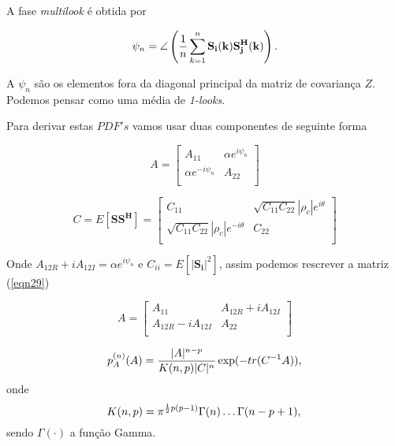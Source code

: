 A fase {\it multilook} é obtida por 

\begin{equation}\label{eqn28}
	\psi_n=\angle\left(\frac{1}{n}\sum_{k=1}^{n}\mathbf{S_i(k)S_j^{H}(k)}\right). \\
\end{equation}

A $\psi_n$ são os elementos fora da diagonal principal da matriz de covariança $Z$. Podemos pensar como uma média de {\it 1-looks}.

Para derivar estas $PDF's$ vamos usar duas componentes de seguinte forma

\begin{equation}\label{eqn29}
	A=\left[
\begin{array}{cc}
	A_{11}              & \alpha e^{i\psi_n} \\
	\alpha e^{-i\psi_n} & A_{22} \\
\end{array}\right]
\end{equation}


\begin{equation}\label{eqn30}
	C=E[\mathbf{SS^{H}}]=\left[
\begin{array}{cc}
	C_{11}              & \sqrt{C_{11}C_{22}}|\rho_c|e^{i\theta} \\
 \sqrt{C_{11}C_{22}}|\rho_c |e^{-i\theta} & C_{22}\\
\end{array}\right]
\end{equation}

Onde $A_{12R}+iA_{12I}=\alpha e^{i\psi_n}$ e $C_{ii}=E[|\mathbf{S_i}|^2]$, assim podemos rescrever a matriz (\ref{eqn29})

\begin{equation}\label{eqn31}
	A=\left[
\begin{array}{cc}
	A_{11}              & A_{12R}+iA_{12I} \\
	A_{12R}-iA_{12I}    & A_{22} \\
\end{array}\right]
\end{equation}


\begin{equation}\label{eqn32}
	p_A^{(n)}(A)=\frac{|A|^{n-p}}{K(n,p)|C|^n} \exp(-tr(C^{-1}A)), \\
\end{equation}
onde
\begin{equation}\label{eqn33}
	K(n,p)=\pi^{\frac{1}{2}p(p-1)}\Gamma(n)\dots\Gamma(n-p+1), \\
\end{equation}
sendo $\Gamma(\cdot)$ a função Gamma.


